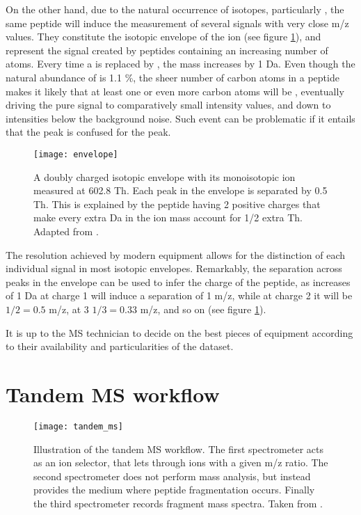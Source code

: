 \documentclass[thesis]{subfiles}
\begin{document}
On the other hand, due to the natural occurrence of isotopes, particularly , the same peptide will induce the measurement of several signals with very close \ac{m/z} values. They constitute the isotopic envelope of the ion (see figure \ref{fig:envelope}), and represent the signal created by peptides containing an increasing number of  atoms. Every time a  is replaced by , the mass increases by 1 Da. Even though the natural abundance of  is 1.1 \%, the sheer number of carbon atoms in a peptide makes it likely that at least one or even more carbon atoms will be , eventually driving the pure  signal to comparatively small intensity values, and down to intensities below the background noise. Such event can be problematic if it entails that the  peak is confused for the  peak.

\begin{figure}[!h]
\texttt{[image: envelope]}
\caption{A doubly charged isotopic envelope with its monoisotopic ion measured at 602.8 Th. Each peak in the envelope is separated by 0.5 Th. This is explained by the peptide having 2 positive charges that make every extra Da in the ion mass account for 1/2 extra Th. Adapted from \cite{Mirzaei2016}.}
\label{fig:envelope}
\end{figure}


The resolution achieved by modern equipment allows for the distinction of each individual signal in most isotopic envelopes. Remarkably, the separation across peaks in the envelope can be used to infer the charge of the peptide, as increases of 1 Da at charge 1 will induce a separation of 1 \ac{m/z}, while at charge 2 it will be $1/2 = 0.5$ \ac{m/z}, at 3 $1/3 = 0.33$ \ac{m/z}, and so on (see figure \ref{fig:envelope}).

It is up to the \ac{MS} technician to decide on the best pieces of equipment according to their availability and particularities of the dataset.

\section{Tandem MS workflow}
\label{sec:tandem_ms_workflow}

\begin{figure}[!h]
\texttt{[image: tandem\_ms]}
\caption[]{Illustration of the tandem MS workflow. The first spectrometer acts as an ion selector, that lets through ions with a given \ac{m/z} ratio. The second spectrometer does not perform mass analysis, but instead provides the medium where peptide fragmentation occurs. Finally the third spectrometer records fragment mass spectra. Taken from \footnotemark{}.}
\label{fig:tandem_ms}
\end{figure}
\end{document}
